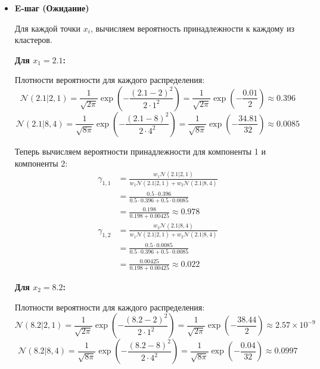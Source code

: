\begin{itemize}
    \item \textbf{E-шаг (Ожидание)}

          Для каждой точки $x_i$, вычисляем вероятность принадлежности к каждому из кластеров.

          \textbf{Для $x_1 = 2.1$:}

          Плотности вероятности для каждого распределения:
          \[
              \mathcal{N}(2.1 | 2, 1) = \frac{1}{\sqrt{2\pi}} \exp\left( -\frac{(2.1 - 2)^2}{2 \cdot 1^2} \right) = \frac{1}{\sqrt{2\pi}} \exp\left( -\frac{0.01}{2} \right) \approx 0.396
          \]
          \[
              \mathcal{N}(2.1 | 8, 4) = \frac{1}{\sqrt{8\pi}} \exp\left( -\frac{(2.1 - 8)^2}{2 \cdot 4^2} \right) = \frac{1}{\sqrt{8\pi}} \exp\left( -\frac{34.81}{32} \right) \approx 0.0085
          \]

          Теперь вычисляем вероятности принадлежности для компоненты 1 и компоненты 2:
          \begin{align*}
              \gamma_{1,1} & = \frac{w_1 \mathcal{N}(2.1 | 2, 1)}{w_1 \mathcal{N}(2.1 | 2, 1) + w_2 \mathcal{N}(2.1 | 8, 4)} \\
                           & = \frac{0.5 \cdot 0.396}{0.5 \cdot 0.396 + 0.5 \cdot 0.0085}                                    \\
                           & = \frac{0.198}{0.198 + 0.00425} \approx 0.978
          \end{align*}
          \begin{align*}
              \gamma_{1,2} & = \frac{w_2 \mathcal{N}(2.1 | 8, 4)}{w_1 \mathcal{N}(2.1 | 2, 1) + w_2 \mathcal{N}(2.1 | 8, 4)} \\
                           & = \frac{0.5 \cdot 0.0085}{0.5 \cdot 0.396 + 0.5 \cdot 0.0085}                                   \\
                           & = \frac{0.00425}{0.198 + 0.00425} \approx 0.022
          \end{align*}

          \textbf{Для $x_2 = 8.2$:}

          Плотности вероятности для каждого распределения:
          \[
              \mathcal{N}(8.2 | 2, 1) = \frac{1}{\sqrt{2\pi}} \exp\left( -\frac{(8.2 - 2)^2}{2 \cdot 1^2} \right) = \frac{1}{\sqrt{2\pi}} \exp\left( -\frac{38.44}{2} \right) \approx 2.57 \times 10^{-9}
          \]
          \[
              \mathcal{N}(8.2 | 8, 4) = \frac{1}{\sqrt{8\pi}} \exp\left( -\frac{(8.2 - 8)^2}{2 \cdot 4^2} \right) = \frac{1}{\sqrt{8\pi}} \exp\left( -\frac{0.04}{32} \right) \approx 0.0997
          \]


\end{itemize}
